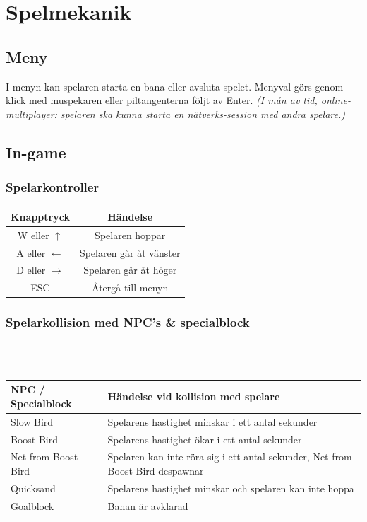 \documentclass{TDP003mall}
\begin{document}
\newpage

\section{Spelmekanik}
\subsection{Meny}
I menyn kan spelaren starta en bana eller avsluta spelet. Menyval görs genom klick med muspekaren eller piltangenterna följt av Enter. \textit{(I mån av tid, online-multiplayer: spelaren ska kunna starta en nätverks-session med andra spelare.)}

\subsection{In-game}

\subsubsection{Spelarkontroller}
\begin{tabular}{|c|c|}
\hline
\textbf{Knapptryck} & \textbf{Händelse} \\\hline
W eller $\uparrow$ & Spelaren hoppar \\\hline
A eller $\leftarrow$ & Spelaren går åt vänster \\\hline
D eller $\rightarrow$ & Spelaren går åt höger \\\hline
ESC & Återgå till menyn \\\hline
\end{tabular}

\subsubsection{Spelarkollision med NPC's \& specialblock}
\\\\
\begin{tabular}{|l|l|}
\hline
\textbf{NPC / Specialblock} & \textbf{Händelse vid kollision med spelare}\\\hline
Slow Bird & Spelarens hastighet minskar i ett antal sekunder\\\hline
Boost Bird & Spelarens hastighet ökar i ett antal sekunder\\\hline
Net from Boost Bird & Spelaren kan inte röra sig i ett antal sekunder, Net from Boost Bird despawnar\\\hline
Quicksand & Spelarens hastighet minskar och spelaren kan inte hoppa \\\hline
Goalblock & Banan är avklarad \\\hline
\end{tabular}
\end{document}
